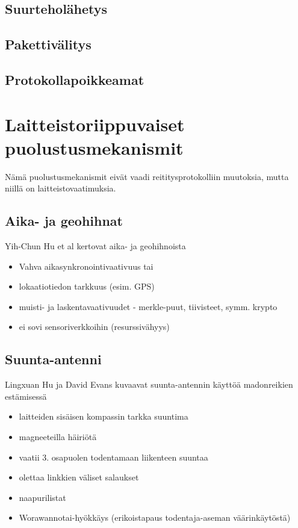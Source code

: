 \documentclass[finnish]{tktltiki2}
\theoremstyle{definition}
\theoremstyle{remark}
\begin{document}
\subsection{Suurteholähetys}
\subsection{Pakettivälitys}
\subsection{Protokollapoikkeamat}

\section{Laitteistoriippuvaiset puolustusmekanismit}

Nämä puolustusmekanismit eivät vaadi reititysprotokolliin muutoksia, mutta niillä on laitteistovaatimuksia.

\subsection{Aika- ja geohihnat}
Yih-Chun Hu et al kertovat aika- ja geohihnoista \cite{leashes}

\begin{itemize}
\item Vahva aikasynkronointivaativuus tai
\item lokaatiotiedon tarkkuus (esim. GPS)
\item muisti- ja laskentavaativuudet - merkle-puut, tiivisteet, symm. krypto
\item ei sovi sensoriverkkoihin (resurssivähyys)
\end{itemize}

\subsection{Suunta-antenni}
Lingxuan Hu ja David Evans kuvaavat suunta-antennin käyttöä madonreikien estämisessä \cite{antenna}
\begin{itemize}
\item laitteiden sisäisen kompassin tarkka suuntima
\item magneeteilla häiriötä
\item vaatii 3. osapuolen todentamaan liikenteen suuntaa
\item olettaa linkkien väliset salaukset
\item naapurilistat
\item Worawannotai-hyökkäys (erikoistapaus todentaja-aseman väärinkäytöstä)
\end{itemize}
\end{document}
